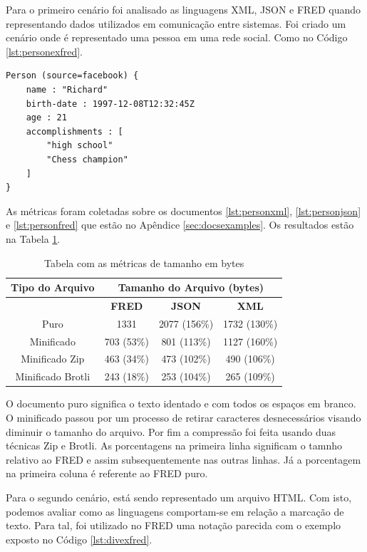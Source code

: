 Para o primeiro cenário foi analisado as linguagens XML, JSON e FRED  quando representando dados
utilizados em comunicação entre sistemas. Foi criado um cenário onde é representado 
uma pessoa em uma rede social. Como no Código \ref{lst:personexfred}.

\begin{lstlisting}[caption=Exemplo de dado sobre uma pessoa ,label={lst:personexfred}]
Person (source=facebook) {
    name : "Richard"
    birth-date : 1997-12-08T12:32:45Z
    age : 21
    accomplishments : [
        "high school"
        "Chess champion"
    ]
}
\end{lstlisting}

As métricas foram coletadas sobre os documentos \ref{lst:personxml}, \ref{lst:personjson} e
\ref{lst:personfred} que estão no Apêndice \ref{sec:docsexamples}. Os resultados estão 
na Tabela \ref{tbl:persondocs}. 

\begin{table}[h]
    \centering
	\caption{Tabela com as métricas de tamanho em bytes}
	\label{tbl:persondocs}
    \begin{tabular}{cccc}
        \toprule
        \multicolumn{1}{c}{\textbf{Tipo do Arquivo}} & \multicolumn{3}{c}{\textbf{Tamanho do Arquivo (bytes)}} \\
        \midrule
                                                     & \textbf{FRED} & \textbf{JSON} & \textbf{XML}    \\
        \midrule
        Puro              & 1331       & 2077 (156\%) & 1732 (130\%) \\
		Minificado        & 703 (53\%) & 801  (113\%) & 1127 (160\%) \\
        Minificado Zip    & 463 (34\%) & 473  (102\%) & 490  (106\%) \\
        Minificado Brotli & 243 (18\%) & 253  (104\%) & 265  (109\%) \\
		\bottomrule
    \end{tabular}
\end{table}

O documento puro significa o texto identado e com todos os espaços em branco.
O minificado passou por um processo de retirar caracteres desnecessários visando
diminuir o tamanho do arquivo. Por fim a compressão foi feita usando duas técnicas
Zip e Brotli.  As porcentagens na primeira linha significam o tamnho relativo ao
FRED e assim subsequentemente nas outras linhas. Já a porcentagem na primeira coluna
é referente ao FRED puro.

Para o segundo cenário, está sendo representado um arquivo HTML. Com isto, podemos avaliar
como as linguagens comportam-se em relação a marcação de texto. Para tal,
foi utilizado no FRED uma notação parecida com o exemplo exposto no Código \ref{lst:divexfred}.

